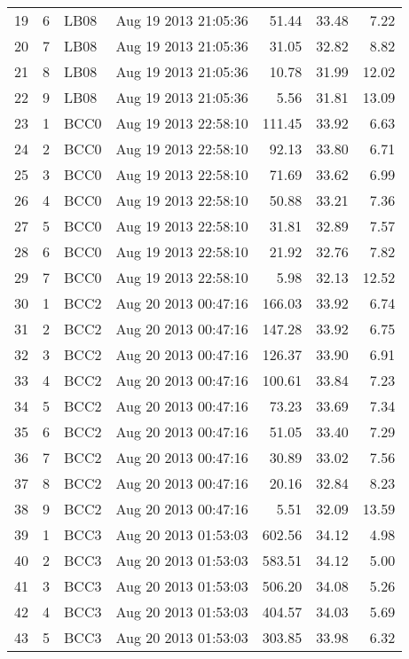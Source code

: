 \documentclass{article}
\begin{document}
\begin{longtable}{ccllrrr}
19 & 6 & LB08 & Aug 19 2013 21:05:36 & 51.44 & 33.48 & 7.22 \\
20 & 7 & LB08 & Aug 19 2013 21:05:36 & 31.05 & 32.82 & 8.82 \\
21 & 8 & LB08 & Aug 19 2013 21:05:36 & 10.78 & 31.99 & 12.02 \\
22 & 9 & LB08 & Aug 19 2013 21:05:36 & 5.56 & 31.81 & 13.09 \\
\hline
23 & 1 & BCC0 & Aug 19 2013 22:58:10 & 111.45 & 33.92 & 6.63 \\
24 & 2 & BCC0 & Aug 19 2013 22:58:10 & 92.13 & 33.80 & 6.71 \\
25 & 3 & BCC0 & Aug 19 2013 22:58:10 & 71.69 & 33.62 & 6.99 \\
26 & 4 & BCC0 & Aug 19 2013 22:58:10 & 50.88 & 33.21 & 7.36 \\
27 & 5 & BCC0 & Aug 19 2013 22:58:10 & 31.81 & 32.89 & 7.57 \\
28 & 6 & BCC0 & Aug 19 2013 22:58:10 & 21.92 & 32.76 & 7.82 \\
29 & 7 & BCC0 & Aug 19 2013 22:58:10 & 5.98 & 32.13 & 12.52 \\
\hline
30 & 1 & BCC2 & Aug 20 2013 00:47:16 & 166.03 & 33.92 & 6.74 \\
31 & 2 & BCC2 & Aug 20 2013 00:47:16 & 147.28 & 33.92 & 6.75 \\
32 & 3 & BCC2 & Aug 20 2013 00:47:16 & 126.37 & 33.90 & 6.91 \\
33 & 4 & BCC2 & Aug 20 2013 00:47:16 & 100.61 & 33.84 & 7.23 \\
34 & 5 & BCC2 & Aug 20 2013 00:47:16 & 73.23 & 33.69 & 7.34 \\
35 & 6 & BCC2 & Aug 20 2013 00:47:16 & 51.05 & 33.40 & 7.29 \\
36 & 7 & BCC2 & Aug 20 2013 00:47:16 & 30.89 & 33.02 & 7.56 \\
37 & 8 & BCC2 & Aug 20 2013 00:47:16 & 20.16 & 32.84 & 8.23 \\
38 & 9 & BCC2 & Aug 20 2013 00:47:16 & 5.51 & 32.09 & 13.59 \\
\hline
39 & 1 & BCC3 & Aug 20 2013 01:53:03 & 602.56 & 34.12 & 4.98 \\
40 & 2 & BCC3 & Aug 20 2013 01:53:03 & 583.51 & 34.12 & 5.00 \\
41 & 3 & BCC3 & Aug 20 2013 01:53:03 & 506.20 & 34.08 & 5.26 \\
42 & 4 & BCC3 & Aug 20 2013 01:53:03 & 404.57 & 34.03 & 5.69 \\
43 & 5 & BCC3 & Aug 20 2013 01:53:03 & 303.85 & 33.98 & 6.32 \\

\end{longtable}
\end{document}
